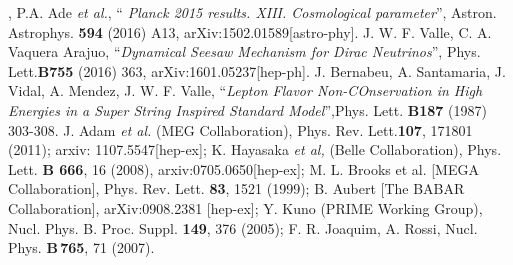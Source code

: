 \documentclass[a4paper,11pt]{article}
\begin{document}
\begin{thebibliography}{99}
, P.A. Ade {\em et al.}, ``{ \em
  Planck 2015 results. XIII. Cosmological parameter}'',
  Astron. Astrophys. {\bf 594} (2016) A13, arXiv:1502.01589[astro-phy].
 J. W. F. Valle, C. A. Vaquera Arajuo, ``{\em Dynamical Seesaw Mechanism for Dirac Neutrinos}'', Phys. Lett.{\bf B755} (2016) 363, arXiv:1601.05237[hep-ph]. 
 J. Bernabeu, A. Santamaria, J. Vidal, A. Mendez, J. W. F. Valle, ``{\em Lepton Flavor Non-COnservation in High Energies in a Super String Inspired Standard Model}'',Phys. Lett. {\bf B187} (1987) 303-308.
 J. Adam {\em et al.} (MEG Collaboration),
Phys. Rev. Lett.{\bf 107}, 171801 (2011); arxiv: 1107.5547[hep-ex];
K. Hayasaka {\em et al,} (Belle Collaboration), Phys. Lett. {\bf B
  666}, 16 (2008), arxiv:0705.0650[hep-ex]; M. L. Brooks et al. [MEGA Collaboration], Phys. Rev. Lett. {\bf 83}, 1521 (1999); 
 B. Aubert [The BABAR Collaboration], arXiv:0908.2381 [hep-ex]; 
   Y. Kuno (PRIME Working Group), Nucl. Phys. B. Proc. Suppl. {\bf
     149}, 376 (2005);  F. R. Joaquim, A. Rossi, Nucl. Phys. {\bf B\,765}, 71 (2007).




\end{thebibliography}
\end{document}
